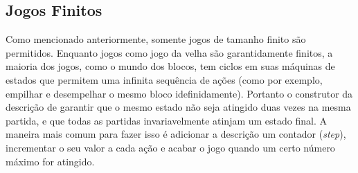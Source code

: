 \subsection{Jogos Finitos}
Como mencionado anteriormente, somente jogos de tamanho finito são permitidos.  Enquanto jogos como jogo da velha são garantidamente finitos, a maioria dos jogos, como o mundo dos blocos, tem ciclos em suas máquinas de estados que permitem uma infinita sequência de ações (como por exemplo, empilhar e desempelhar o mesmo bloco idefinidamente). Portanto o construtor da descrição de garantir que o mesmo estado não seja atingido duas vezes na mesma partida, e que todas as partidas invariavelmente atinjam um estado final. A maneira mais comum para fazer isso é adicionar a descrição um contador (\textit{step}), incrementar o seu valor a cada ação e acabar o jogo quando um certo número máximo for atingido.